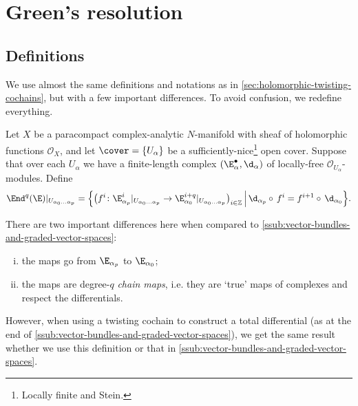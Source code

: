 
\section{Green's resolution} %
\label{sec:green_s_resolution}

    \subsection{Definitions} %
    \label{sub:definitions}

        \begin{note}
            We use almost the same definitions and notations as in \cref{sec:holomorphic-twisting-cochains}, but with a few important differences.
            To avoid confusion, we redefine everything.
        \end{note}
        
        Let $X$ be a paracompact complex-analytic $N$-manifold with sheaf of holomorphic functions $\mathcal{O}_X$, and let $\cover=\{U_\alpha\}$ be a sufficiently-nice\footnote{Locally finite and Stein.} open cover.
        Suppose that over each $U_\alpha$ we have a finite-length complex $(\E_\alpha^\bullet,\d_\alpha)$ of locally-free $\mathcal{O}_{U_\alpha}$-modules.
        Define 
        \[
            \End^q(\E)|_{U_{\alpha_0\ldots\alpha_p}} = \Big\{\big(f^i\colon \E_{\alpha_p}^i|_{U_{\alpha_0\ldots\alpha_p}}\to \E_{\alpha_0}^{i+q}|_{U_{\alpha_0\ldots\alpha_p}}\big)_{i\in\mathbb{Z}} \,\Big|\, \d_{\alpha_p}\circ\,f^i = f^{i+1}\circ\,\d_{\alpha_0}\Big\}.
        \]

        There are two important differences here when compared to \cref{ssub:vector-bundles-and-graded-vector-spaces}:
        \begin{enumerate}[(i)]
            \item the maps go from $\E_{\alpha_p}$ to $\E_{\alpha_0}$;
            \item the maps are degree-$q$ \textit{chain maps}, i.e. they are `true' maps of complexes and respect the differentials.
        \end{enumerate}
        However, when using a twisting cochain to construct a total differential (as at the end of \cref{ssub:vector-bundles-and-graded-vector-spaces}), we get the same result whether we use this definition or that in \cref{ssub:vector-bundles-and-graded-vector-spaces}.
        
